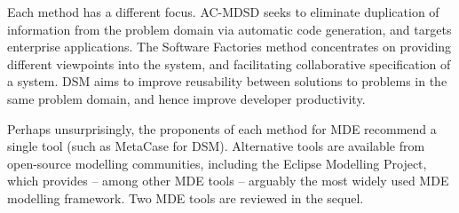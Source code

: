 Each method has a different focus. AC-MDSD seeks to eliminate duplication of information from the problem domain via automatic code generation, and targets enterprise applications. The Software Factories method concentrates on providing different viewpoints into the system, and facilitating collaborative specification of a system. DSM aims to improve reusability between solutions to problems in the same problem domain, and hence improve developer productivity.

Perhaps unsurprisingly, the proponents of each method for MDE recommend a single tool (such as MetaCase for DSM). Alternative tools are available from open-source modelling communities, including the Eclipse Modelling Project, which provides -- among other MDE tools -- arguably the most widely used MDE modelling framework. Two MDE tools are reviewed in the sequel.